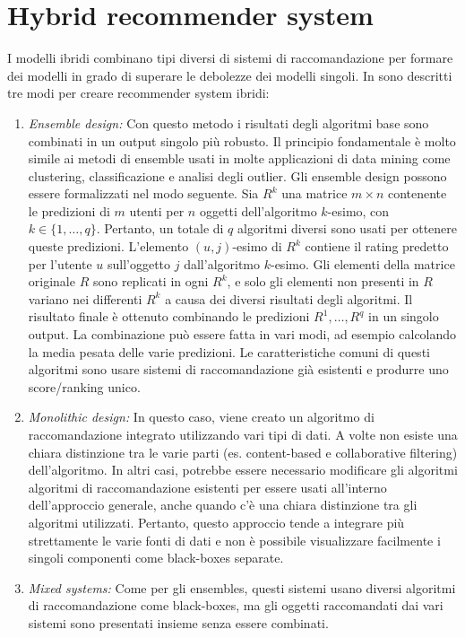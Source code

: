 \documentclass[12pt,italian]{report}
\begin{document}
\section{Hybrid recommender system}
I modelli ibridi combinano tipi diversi di sistemi di raccomandazione per formare dei modelli in grado di superare le debolezze dei modelli singoli. In \cite{recsys-book} sono descritti tre modi per creare recommender system ibridi:

\begin{enumerate}
 \item \textit{Ensemble design:} Con questo metodo i risultati degli algoritmi base sono combinati in un output singolo più robusto. Il principio fondamentale è molto simile ai metodi di ensemble usati in molte applicazioni di data mining come clustering, classificazione e analisi degli outlier. 
Gli ensemble design possono essere formalizzati nel modo seguente. Sia $R^k$ una matrice $m \times n$ contenente le predizioni di $m$ utenti per $n$ oggetti dell'algoritmo $k$-esimo, con $k \in \{1, \dots ,q\}$. Pertanto, un totale di $q$ algoritmi diversi sono usati per ottenere queste predizioni. L'elemento $(u,j)$-esimo di $R^k$ contiene il rating predetto per l'utente $u$ sull'oggetto $j$ dall'algoritmo $k$-esimo. Gli elementi della matrice originale $R$ sono replicati in ogni $R^k$, e solo gli elementi non presenti in $R$ variano nei differenti $R^k$ a causa dei diversi risultati degli algoritmi. Il risultato finale è ottenuto combinando le predizioni $R^1, \dots, R^q$ in un singolo output. La combinazione può essere fatta in vari modi, ad esempio calcolando la media pesata delle varie predizioni. Le caratteristiche comuni di questi algoritmi sono usare sistemi di raccomandazione già esistenti e produrre uno score/ranking unico.
 \item \textit{Monolithic design:} In questo caso, viene creato un algoritmo di raccomandazione integrato utilizzando vari tipi di dati. A volte non esiste una chiara distinzione tra le varie parti (es. content-based e collaborative filtering) dell'algoritmo. In altri casi, potrebbe essere necessario modificare gli algoritmi algoritmi di raccomandazione esistenti per essere usati all'interno dell'approccio generale, anche quando c'è una chiara distinzione tra gli algoritmi utilizzati.  Pertanto, questo approccio tende a integrare più strettamente le varie fonti di dati e non è possibile visualizzare facilmente i singoli componenti come black-boxes separate.
 \item \textit{Mixed systems:}  Come per gli ensembles, questi sistemi usano diversi algoritmi di raccomandazione come black-boxes, ma gli oggetti raccomandati dai vari sistemi sono presentati insieme senza essere combinati.
\end{enumerate} 
\end{document}
